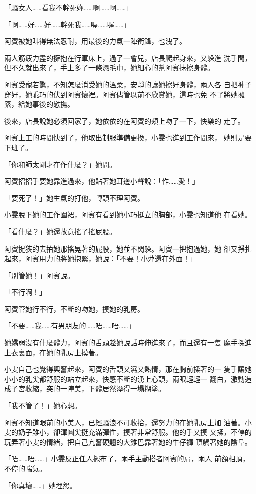 「騷女人……看我不幹死妳……啊……啊……」

「啊……好……好……幹死我……喔……喔……」

阿賓被她叫得無法忍耐，用最後的力氣一陣衝鋒，也洩了。

兩人筋疲力盡的擁抱在行軍床上，過了一會兒，店長爬起身來，又躲進
洗手間，但不久就出來了，手上多了一條濕毛巾，她細心的幫阿賓抹擦身體。

阿賓受寵若驚，不知怎麼消受她的溫柔，安靜的讓她擦好身體，兩人各
自把褲子穿好，她乖巧的伏到阿賓懷裡。阿賓儘管以前不欣賞她，這時也免
不了將她擁緊，給她事後的慰撫。

後來，店長說她必須回家了，她依依的在阿賓的頰上吻了一下，快樂的
走了。

阿賓上工的時間快到了，他取出制服準備更換，小雯也進到工作間來，
她則是要下班了。

「你和師太剛才在作什麼？」她問。

阿賓招招手要她靠進過來，他貼著她耳邊小聲說：「作……愛！」

「要死了！」她生氣的打他，轉頭不理阿賓。

小雯脫下她的工作圍裙，阿賓有看到她小巧挺立的胸部，小雯也知道他
在看她。

「看什麼？」她還故意搖了搖屁股。

阿賓捉狹的去拍她那搖晃著的屁股，她並不閃躲。阿賓一把抱過她，她
卻又掙扎起來，阿賓用力的將她抱緊，她說：「不要！小萍還在外面！」

「別管她！」阿賓說。

「不行啊！」

阿賓管她行不行，不斷的吻她，摸她的乳房。

「不要……我……有男朋友的……唔……唔……」

她嬌弱沒有什麼體力，阿賓的舌頭趁她說話時伸進來了，而且還有一隻
魔手探進上衣裏面，在她的乳房上摸著。

小雯自己也覺得興奮起來，阿賓的舌頭又濕又熱情，那在胸前揉著的一
隻手讓她小小的乳尖都舒服的站立起來，快感不斷的湧上心頭，兩眼輕輕一
翻白，激動造成子宮收縮，突的一陣美，下體居然溼得一塌糊塗。

「我不管了！」她心想。

阿賓不知道眼前的小美人，已經騷浪不可收拾，還努力的在她乳房上加
油著。小雯的奶子雖小，卻渾圓尖挺充滿彈性，摸著非常舒服。他的手又摸
又揉，不停的玩弄著小雯的情緒，把自己亢奮硬翹的大雞巴靠著她的牛仔褲
頂觸著她的陰阜。

「唔……唔……」小雯反正任人擺布了，兩手主動搭者阿賓的肩，兩人
前額相頂，不停的喘氣。

「你真壞……」她埋怨。

